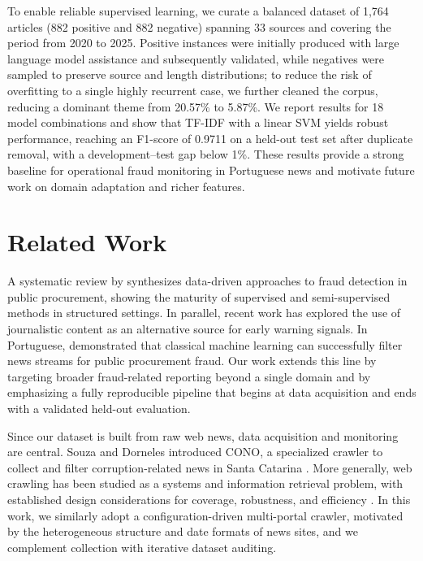 \documentclass[conference]{IEEEtran}
\begin{document}
To enable reliable supervised learning, we curate a balanced dataset of 1,764 articles (882 positive and 882 negative) spanning 33 sources and covering the period from 2020 to 2025. Positive instances were initially produced with large language model assistance and subsequently validated, while negatives were sampled to preserve source and length distributions; to reduce the risk of overfitting to a single highly recurrent case, we further cleaned the corpus, reducing a dominant theme from 20.57\% to 5.87\%. We report results for 18 model combinations and show that TF-IDF with a linear SVM yields robust performance, reaching an F1-score of 0.9711 on a held-out test set after duplicate removal, with a development--test gap below 1\%. These results provide a strong baseline for operational fraud monitoring in Portuguese news and motivate future work on domain adaptation and richer features.


\section{Related Work}
A systematic review by \cite{santos2025mapping} synthesizes data-driven approaches to fraud detection in public procurement, showing the maturity of supervised and semi-supervised methods in structured settings. In parallel, recent work has explored the use of journalistic content as an alternative source for early warning signals. In Portuguese, \cite{assis2025classification} demonstrated that classical machine learning can successfully filter news streams for public procurement fraud. Our work extends this line by targeting broader fraud-related reporting beyond a single domain and by emphasizing a fully reproducible pipeline that begins at data acquisition and ends with a validated held-out evaluation.

Since our dataset is built from raw web news, data acquisition and monitoring are central. Souza and Dorneles introduced CONO, a specialized crawler to collect and filter corruption-related news in Santa Catarina \cite{souza2025cono}. More generally, web crawling has been studied as a systems and information retrieval problem, with established design considerations for coverage, robustness, and efficiency \cite{olston2010webcrawling}. In this work, we similarly adopt a configuration-driven multi-portal crawler, motivated by the heterogeneous structure and date formats of news sites, and we complement collection with iterative dataset auditing.
\end{document}
